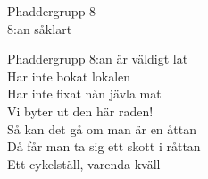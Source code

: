 
  {\Large Phaddergrupp 8}\\{\tiny  8:an såklart}
  \begin{vers}
Phaddergrupp 8:an är väldigt lat\\
Har inte bokat lokalen\\
Har inte fixat nån jävla mat\\
Vi byter ut den här raden!\\
Så kan det gå om man är en åttan\\
Då får man ta sig ett skott i råttan\\
Ett cykelställ, varenda kväll\\
  \end{vers}
